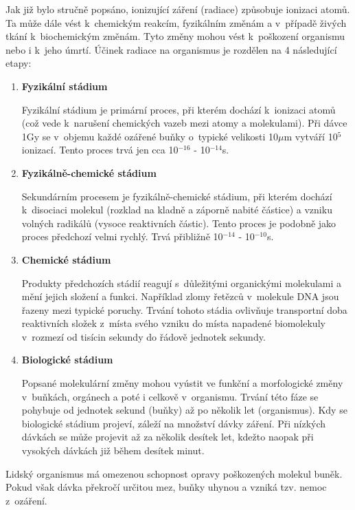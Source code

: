 Jak již bylo stručně popsáno, ionizující záření (radiace) způsobuje ionizaci atomů. Ta může dále vést k~chemickým reakcím, fyzikálním změnám a v~případě živých tkání k~biochemickým změnám. Tyto změny mohou vést k~poškození organismu nebo i k~jeho úmrtí. Účinek radiace na organismus je rozdělen na 4 následující etapy: \cite{bioZarUllman}

\begin{enumerate}
	\item \textbf{Fyzikální stádium}
	
		Fyzikální stádium je primární proces, při kterém dochází k~ionizaci atomů (což vede k~narušení chemických vazeb mezi atomy a molekulami). Při dávce 1Gy se v~objemu každé ozářené buňky o~typické velikosti 10$\mu$m vytváří 10$^5$ ionizací. Tento proces trvá jen cca 10$^{-16}$ - 10$^{-14}$s.
		
	\item \textbf{Fyzikálně-chemické stádium}
	
	Sekundárním procesem je fyzikálně-chemické stádium, při kterém dochází k~disociaci molekul (rozklad na kladně a záporně nabité částice) a vzniku volných radikálů (vysoce reaktivních částic). Tento proces je podobně jako proces předchozí velmi rychlý. Trvá přibližně 10$^{-14}$ - 10$^{-10}$s.	 
	
	\item \textbf{Chemické stádium}
	
	Produkty předchozích stádií reagují s~důležitými organickými molekulami a mění jejich složení a funkci. Například zlomy řetězců v~molekule DNA jsou řazeny mezi typické poruchy. Trvání tohoto stádia ovlivňuje transportní doba reaktivních složek z~místa svého vzniku do místa napadené biomolekuly v~rozmezí od tisícin sekundy do řádově jednotek sekundy.
	
	\item \textbf{Biologické stádium}
	
	Popsané molekulární změny mohou vyústit ve funkční a morfologické změny v~buňkách, orgánech a poté i celkově v~organismu. Trvání této fáze se pohybuje od jednotek sekund (buňky) až po několik let (organismus). Kdy se biologické stádium projeví, záleží na množství dávky záření. Při nízkých dávkách se může projevit až za několik desítek let, kdežto naopak při vysokých dávkách již během desítek minut. 
\end{enumerate}

Lidský organismus má omezenou schopnost opravy poškozených molekul buněk. Pokud však dávka překročí určitou mez, buňky uhynou a vzniká tzv. nemoc z~ozáření.


